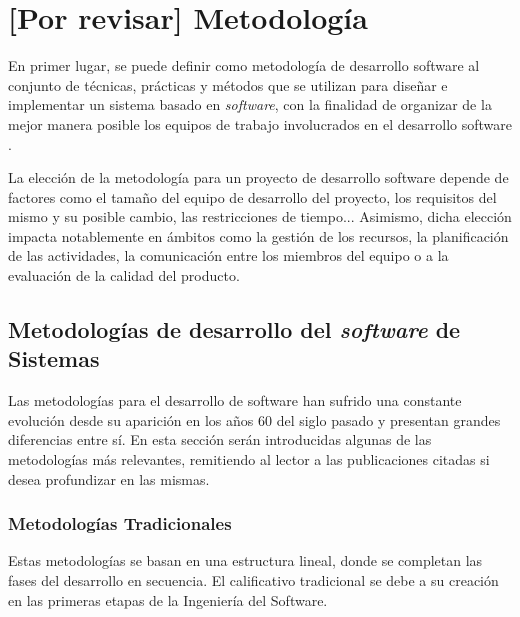 \chapter{[Por revisar] Metodología}
\label{chapter:metodologia}


En primer lugar, se puede definir como metodología de desarrollo software al conjunto de técnicas, prácticas y métodos que se utilizan para diseñar e implementar un sistema basado en \textit{software}, con la finalidad de organizar de la mejor manera posible los equipos de trabajo involucrados en el desarrollo software \cite{santander_universidades_metodologias_2020}.

La elección de la metodología para un proyecto de desarrollo software depende de factores como el tamaño del equipo de desarrollo del proyecto, los requisitos del mismo y su posible cambio, las restricciones de tiempo... Asimismo, dicha elección impacta notablemente en ámbitos como la gestión de los recursos, la planificación de las actividades, la comunicación entre los miembros del equipo o a la evaluación de la calidad del producto.

\section{Metodologías de desarrollo del \textit{software} de Sistemas}

Las metodologías para el desarrollo de software han sufrido una constante evolución desde su aparición en los años 60 del siglo pasado y presentan grandes diferencias entre sí. En esta sección serán introducidas algunas de las metodologías más relevantes, remitiendo al lector a las publicaciones citadas si desea profundizar en las mismas.

    \subsection{Metodologías Tradicionales}
    
    Estas metodologías se basan en una estructura lineal, donde se completan las fases del desarrollo en secuencia. El calificativo tradicional se debe a su creación en las primeras etapas de la Ingeniería del Software.
    
